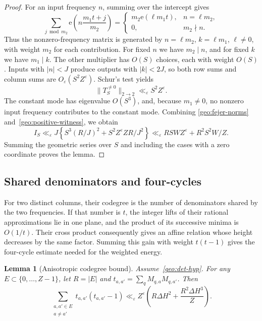 \documentclass[11pt,a4paper]{article}
\theoremstyle{paperplain}
\newtheorem{lemma}[theorem]{Lemma}
\numberwithin{equation}{section}
\begin{document}
\begin{proof}
For an input frequency $n$, summing over the intercept gives
\[
 \sum_{j\bmod m_2}\mathrm e\left(n\frac{m_1t+j}{m_2}\right)
 =\begin{cases}m_2\mathrm e(\ell m_1t),&n=\ell m_2,\\0,&m_2\nmid n.
 \end{cases}
\]
Thus the nonzero-frequency matrix is generated by
$n=\ell m_2$, $k=\ell m_1$, $\ell\ne0$, with weight $m_2$ for each contribution.
For fixed $n$ we have $m_2\mid n$, and for fixed $k$ we have $m_1\mid k$.
The other multiplier has $O(S)$ choices, each with weight $O(S)$.
Inputs with $|n|<J$ produce outputs with $|k|<2J$, so both row sums and column
sums are $O_\varepsilon(S^2Z^\varepsilon)$. Schur's test yields
\[
 \|T_S^{\ne0}\|_{2\to2}\ll_\varepsilon S^2Z^\varepsilon.
\]
The constant mode has eigenvalue $O(S^3)$, and, because $m_1\ne0$, no nonzero
input frequency contributes to the constant mode. Combining
\eqref{geo:fejer-norms} and~\eqref{geo:positive-witness}, we obtain
\[
 I_S\ll_\varepsilon
 J\left\{S^3(R/J)^2+S^2Z^\varepsilon ZR/J^2\right\}
 \ll_\varepsilon RSWZ^\varepsilon+R^2S^2W/Z.
\]
Summing the geometric series over $S$ and including the cases with a zero
coordinate proves the lemma.
\end{proof}

\subsection{Shared denominators and four-cycles}


For two distinct columns, their codegree is the number of denominators shared
by the two frequencies. If that number is $t$, the integer lifts of their
rational approximations lie in one plane, and the product of its successive
minima is $O(1/t)$. Their cross product consequently gives an affine relation
whose height decreases by the same factor. Summing this gain with weight
$t(t-1)$ gives the four-cycle estimate needed for the weighted energy.

\begin{lemma}[Anisotropic codegree bound]\label{geo:codegree}
Assume~\eqref{geo:det-hyp}.
For any $E\subset\{0,\ldots,Z-1\}$, let $R=|E|$ and
$t_{a,a'}=\sum_qM_{q,a}M_{q,a'}$.
Then
\begin{equation}\label{geo:fourcycles}
 \sum_{\substack{a,a'\in E\\a\ne a'}}t_{a,a'}(t_{a,a'}-1)
 \ll_\varepsilon Z^\varepsilon
 \left(R\Delta H^2+\frac{R^2\Delta H^3}{Z}\right).
\end{equation}
\end{lemma}
\end{document}
